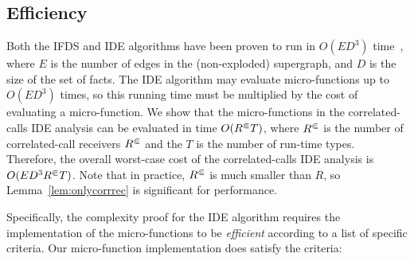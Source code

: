 
\subsection{Efficiency}

Both the IFDS and IDE algorithms have been proven
to run in $O(ED^3)$ time~\cite{reps1995precise,sagiv1996precise},
where $E$ is the number of edges in the (non-exploded) supergraph, and $D$ is the size
of the set of facts.
The IDE algorithm may evaluate micro-functions up to $O(ED^3)$ times,
so this running time must be multiplied by the cost of evaluating a
micro-function. We show that the micro-functions in the correlated-calls
IDE analysis can be evaluated in time $O({R^\Subset} T)$, where ${R^\Subset}$ is the number
of correlated-call receivers ${R^\Subset}$ and the $T$ is the number of run-time
types. Therefore, the overall worst-case cost of the correlated-calls IDE analysis
is $O(ED^3{R^\Subset} T)$. Note that in practice, ${R^\Subset}$ is much smaller
than $R$, so Lemma~\ref{lem:onlycorrrec} is significant for 
performance.

Specifically, the complexity proof for the IDE algorithm requires
the implementation of the micro-functions to be \textit{efficient}
according to a list of specific criteria. Our micro-function
implementation does satisfy the criteria:

